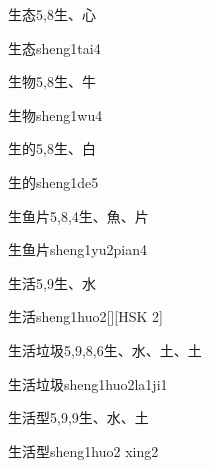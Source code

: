 \begin{entry}{生态}{5,8}{⽣、⼼}
  \begin{phonetics}{生态}{sheng1tai4}
  \end{phonetics}
\end{entry}

\begin{entry}{生物}{5,8}{⽣、⽜}
  \begin{phonetics}{生物}{sheng1wu4}
  \end{phonetics}
\end{entry}

\begin{entry}{生的}{5,8}{⽣、⽩}
  \begin{phonetics}{生的}{sheng1de5}
  \end{phonetics}
\end{entry}

\begin{entry}{生鱼片}{5,8,4}{⽣、⿂、⽚}
  \begin{phonetics}{生鱼片}{sheng1yu2pian4}
  \end{phonetics}
\end{entry}

\begin{entry}{生活}{5,9}{⽣、⽔}
  \begin{phonetics}{生活}{sheng1huo2}[][HSK 2]
  \end{phonetics}
\end{entry}

\begin{entry}{生活垃圾}{5,9,8,6}{⽣、⽔、⼟、⼟}
  \begin{phonetics}{生活垃圾}{sheng1huo2la1ji1}
  \end{phonetics}
\end{entry}

\begin{entry}{生活型}{5,9,9}{⽣、⽔、⼟}
  \begin{phonetics}{生活型}{sheng1huo2 xing2}
  \end{phonetics}
\end{entry}

